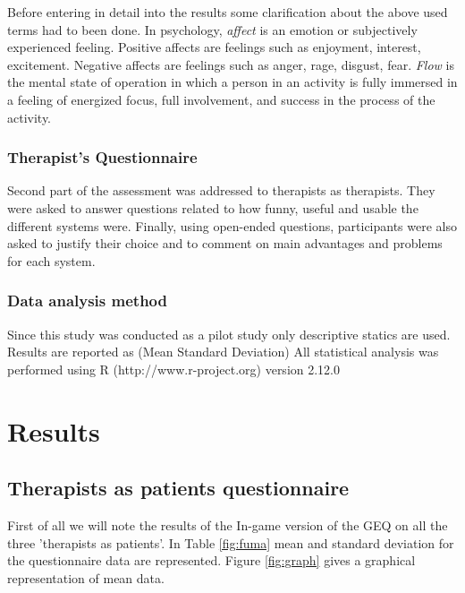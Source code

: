 \documentclass[preprint,authoryear,12pt]{elsarticle}
\begin{document}
\par\medskip

Before entering in detail into the results some clarification about the above used terms had to been done.
In psychology, \emph{affect} is an emotion or subjectively experienced feeling. 
Positive affects are feelings such as enjoyment, interest, excitement. Negative affects are feelings such as anger, rage, disgust, fear.
 \emph{Flow} \citep{csik} is the mental state of operation in which a person in an activity is fully immersed in a feeling of energized focus, full involvement, and success in the process of the activity.

\par \medskip

\subsubsection{Therapist's Questionnaire}
Second part of the assessment was addressed to therapists as therapists. They were asked to answer questions related to how funny, useful and usable the different systems were. Finally, using open-ended questions, participants were also asked
to justify their choice and to comment on main advantages and problems for each system. 

\subsubsection{Data analysis method}
\label{dataanalysis}
Since this study was conducted as a pilot study only descriptive statics are used. Results are reported as (Mean  Standard Deviation) All statistical analysis was performed using R (http://www.r-project.org) version 2.12.0


\section{Results}
\label{results}
\subsection{Therapists as patients questionnaire}
\label{resultspatient}
First of all we will note the results of the In-game version of the GEQ on all the three 'therapists as patients'. In Table \ref{fig:fuma} mean and standard deviation for the questionnaire data are represented. Figure 	\ref{fig:graph} gives a graphical representation of mean data.
\end{document}
